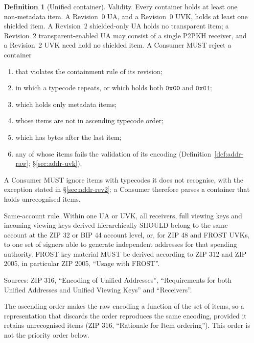\documentclass[11pt,a4paper]{article}
\theoremstyle{definition}
\newtheorem{definition}[theorem]{Definition}
\begin{document}
\begin{definition}[Unified container]
Validity. Every container holds at least one non-metadata item. A
Revision~$0$ UA, and a Revision~$0$ UVK, holds at least one shielded item. A
Revision~$2$ shielded-only UA holds no transparent item; a Revision~$2$
transparent-enabled UA may consist of a single P2PKH receiver, and a
Revision~$2$ UVK need hold no shielded item. A Consumer MUST reject a
container
\begin{enumerate}[label=(\roman*)]
\item that violates the containment rule of its revision;
\item in which a typecode repeats, or which holds both $\mathtt{0x00}$ and
  $\mathtt{0x01}$;
\item which holds only metadata items;
\item whose items are not in ascending typecode order;
\item which has bytes after the last item;
\item any of whose items fails the validation of its encoding
  (Definition~\ref{def:addr-raw}; \S\ref{sec:addr-uvk}).
\end{enumerate}
A Consumer MUST ignore items with typecodes it does not recognise, with the
exception stated in \S\ref{sec:addr-rev2}; a Consumer therefore parses a
container that holds unrecognised items.

Same-account rule. Within one UA or UVK, all receivers, full viewing keys
and incoming viewing keys derived hierarchically SHOULD belong to the same
account at the ZIP 32 or BIP 44 account level, or, for ZIP 48 and FROST
UVKs, to one set of signers able to generate independent addresses for that
spending authority. FROST key material MUST be derived according to ZIP 312
and ZIP 2005, in particular ZIP 2005, ``Usage with FROST''.

Sources: ZIP 316, ``Encoding of Unified Addresses'', ``Requirements for both
Unified Addresses and Unified Viewing Keys'' and ``Receivers''.
\end{definition}

The ascending order makes the raw encoding a function of the set of items,
so a representation that discards the order reproduces the same encoding,
provided it retains unrecognised items (ZIP 316, ``Rationale for Item
ordering''). This order is not the priority order below.
\end{document}
